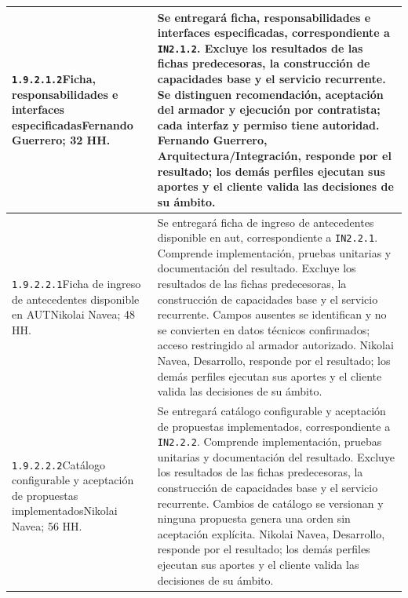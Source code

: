 \begin{longtable}{L{52mm}L{91mm}}
\texttt{1.\allowbreak{}9.\allowbreak{}2.\allowbreak{}1.\allowbreak{}2}\newline Ficha, responsabilidades e interfaces especificadas\newline Fernando Guerrero; 32 HH. & Se entregará ficha, responsabilidades e interfaces especificadas, correspondiente a \texttt{IN2.1.2}. Excluye los resultados de las fichas predecesoras, la construcción de capacidades base y el servicio recurrente.  Se distinguen recomendación, aceptación del armador y ejecución por contratista; cada interfaz y permiso tiene autoridad. Fernando Guerrero, Arquitectura/Integración, responde por el resultado; los demás perfiles ejecutan sus aportes y el cliente valida las decisiones de su ámbito.\\\hline
\texttt{1.\allowbreak{}9.\allowbreak{}2.\allowbreak{}2.\allowbreak{}1}\newline Ficha de ingreso de antecedentes disponible en AUT\newline Nikolai Navea; 48 HH. & Se entregará ficha de ingreso de antecedentes disponible en aut, correspondiente a \texttt{IN2.2.1}. Comprende implementación, pruebas unitarias y documentación del resultado. Excluye los resultados de las fichas predecesoras, la construcción de capacidades base y el servicio recurrente.  Campos ausentes se identifican y no se convierten en datos técnicos confirmados; acceso restringido al armador autorizado. Nikolai Navea, Desarrollo, responde por el resultado; los demás perfiles ejecutan sus aportes y el cliente valida las decisiones de su ámbito.\\\hline
\texttt{1.\allowbreak{}9.\allowbreak{}2.\allowbreak{}2.\allowbreak{}2}\newline Catálogo configurable y aceptación de propuestas implementados\newline Nikolai Navea; 56 HH. & Se entregará catálogo configurable y aceptación de propuestas implementados, correspondiente a \texttt{IN2.2.2}. Comprende implementación, pruebas unitarias y documentación del resultado. Excluye los resultados de las fichas predecesoras, la construcción de capacidades base y el servicio recurrente.  Cambios de catálogo se versionan y ninguna propuesta genera una orden sin aceptación explícita. Nikolai Navea, Desarrollo, responde por el resultado; los demás perfiles ejecutan sus aportes y el cliente valida las decisiones de su ámbito.\\\hline

\end{longtable}
